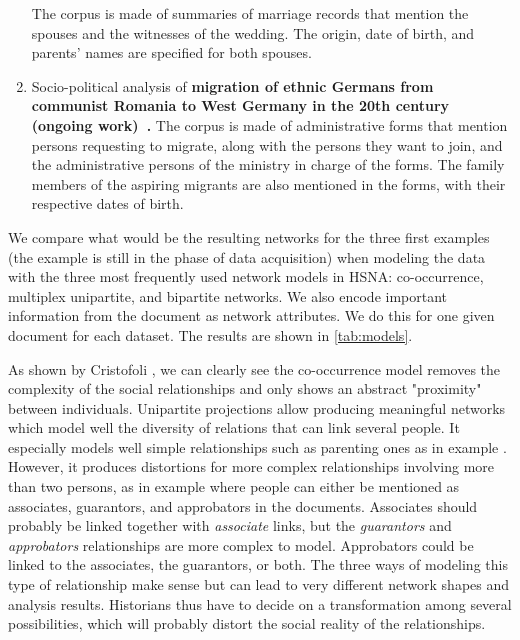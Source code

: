 \begin{enumerate}[nosep,leftmargin=*]
    The corpus is made of summaries of marriage records that mention the spouses and the witnesses of the wedding.
    The origin, date of birth, and parents' names are specified for both spouses.
     \item Socio-political analysis of \textbf{migration of ethnic Germans from communist Romania to West Germany in the 20th century (ongoing work)~\cite{diminescu:hal-02556007}.}
     The corpus is made of administrative forms that mention persons requesting to migrate, along with the persons they want to join, and the administrative persons of the ministry in charge of the forms.
     The family members of the aspiring migrants are also mentioned in the forms, with their respective dates of birth.
\end{enumerate}

We compare what would be the resulting networks for the three first examples (the example \dana is still in the phase of data acquisition) when modeling the data with the three most frequently used network models in HSNA: co-occurrence, multiplex unipartite, and bipartite networks.
We also encode important information from the document as network attributes.
We do this for one given document for each dataset.
The results are shown in \autoref{tab:models}.

As shown by Cristofoli \cite{cristofoliAuxSourcesGrands2008}, we can clearly see the co-occurrence model removes the complexity of the social relationships and only shows an abstract "proximity" between individuals.
Unipartite projections allow producing meaningful networks which model well the diversity of relations that can link several people.
It especially models well simple relationships such as parenting ones as in example \nicole.
However, it produces distortions for more complex relationships involving more than two persons, as in example \pascal where people can either be mentioned as associates, guarantors, and approbators in the documents.
Associates should probably be linked together with \textit{associate} links, but the \textit{guarantors} and \textit{approbators} relationships are more complex to model.
Approbators could be linked to the associates, the guarantors, or both.
The three ways of modeling this type of relationship make sense but can lead to very different network shapes and analysis results.
Historians thus have to decide on a transformation among several possibilities, which will probably distort the social reality of the relationships.

